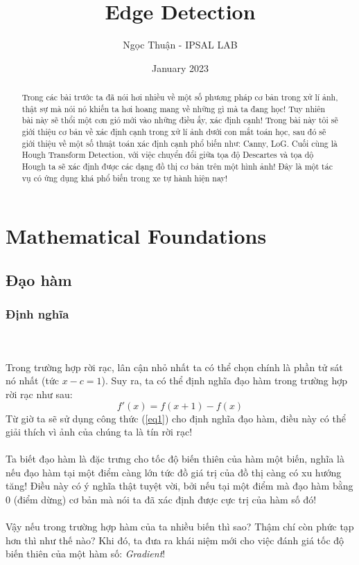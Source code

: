 \documentclass{article}
\title{Edge Detection}
\author{Ngọc Thuận - IPSAL LAB}
\date{January 2023}
\begin{document}
\maketitle
\begin{abstract}
    Trong các bài trước ta đã nói hơi nhiều về một số phương pháp cơ bản trong xử lí ảnh, thật sự mà nói nó khiến ta hơi hoang mang về những gì mà ta đang học! Tuy nhiên bài này sẽ thổi một cơn gió mới vào những điều ấy, xác định cạnh! Trong bài này tôi sẽ giới thiệu cơ bản về xác định cạnh trong xử lí ảnh dưới con mắt toán học, sau đó sẽ giới thiệu về một số thuật toán xác định cạnh phổ biến như: Canny, LoG. Cuối cùng là Hough Transform Detection, với việc chuyển đổi giữa tọa độ Descartes và tọa dộ Hough ta sẽ xác định được các dạng đồ thị cơ bản trên một hình ảnh! Đây là một tác vụ có ứng dụng khá phổ biến trong xe tự hành hiện nay!
\end{abstract}
\tableofcontents
\newpage
\section{Mathematical Foundations}
\label{n1}
\subsection{Đạo hàm}
\subsubsection*{Định nghĩa}
\\\\
Trong trường hợp rời rạc, lân cận nhỏ nhất ta có thể chọn chính là phần tử sát nó nhất (tức $x-c = 1$). Suy ra, ta có thể định nghĩa đạo hàm trong trường hợp rời rạc như sau:
\begin{equation}
    f'(x) = f(x+1)-f(x)
    \label{eq1}
\end{equation}
Từ giờ ta sẽ sử dụng công thức (\ref{eq1}) cho định nghĩa đạo hàm, điều này có thể giải thích vì ảnh của chúng ta là tín rời rạc!\\\\
Ta biết đạo hàm là đặc trưng cho tốc độ biến thiên của hàm một biến, nghĩa là nếu đạo hàm tại một điểm càng lớn tức đồ giá trị của đồ thị càng có xu hướng tăng! Điều này có ý nghĩa thật tuyệt vời, bởi nếu tại một điểm mà đạo hàm bằng 0 (điểm dừng) cơ bản mà nói ta đã xác định được cực trị của hàm số đó! \\\\
Vậy nếu trong trường hợp hàm của ta nhiều biến thì sao? Thậm chí còn phức tạp hơn thì như thế nào? Khi đó, ta đưa ra khái niệm mới cho việc đánh giá tốc độ biến thiên của một hàm số: \textit{Gradient}!
\end{document}
